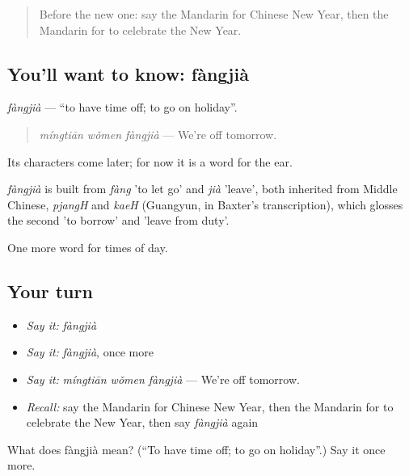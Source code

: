 \label{lesson:ZH-C137-fangjia}



\begin{quote}
Before the new one: say the Mandarin for Chinese New Year, then the Mandarin for to celebrate the New Year.
\end{quote}

\subsection*{You'll want to know: fàngjià}
\emph{fàngjià} — \textquotedblleft{}to have time off; to go on holiday\textquotedblright{}.

\begin{quote}
\emph{míngtiān wǒmen fàngjià} — We're off tomorrow.
\end{quote}

Its characters come later; for now it is a word for the ear.

\begin{cousinweb}
\emph{fàngjià} is built from \emph{fàng} 'to let go' and \emph{jià} 'leave', both inherited from Middle Chinese, \emph{pjangH} and \emph{kaeH} (Guangyun, in Baxter's transcription), which glosses the second 'to borrow' and 'leave from duty'.
\end{cousinweb}

\begin{grammarlens}[title={What you've built}]
One more word for times of day.
\end{grammarlens}

\subsection*{Your turn}
\begin{itemize}
\raggedright
  \item \emph{Say it:} \emph{fàngjià}
  \item \emph{Say it:} \emph{fàngjià}, once more
  \item \emph{Say it:} \emph{míngtiān wǒmen fàngjià} — We're off tomorrow.
  \item \emph{Recall:} say the Mandarin for Chinese New Year, then the Mandarin for to celebrate the New Year, then say \emph{fàngjià} again
\end{itemize}

\begin{tcolorbox}[breakable,colback=teal!4,colframe=teal!35!black,title={Before you move on}]
What does fàngjià mean? (\textquotedblleft{}To have time off; to go on holiday\textquotedblright{}.) Say it once more.
\end{tcolorbox}
